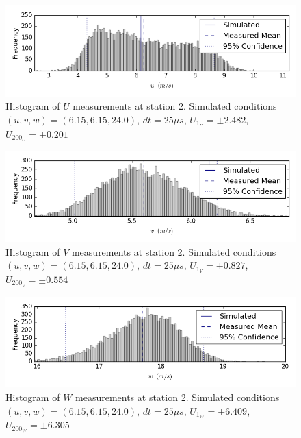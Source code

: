 \begin{figure}[H]
\centering
\includegraphics[width=6in]{figs/Ely_May28th02001/uncertainty_Ely_May28th02001_U}
\caption{Histogram of $U$ measurements at station 2. Simulated conditions $(u,v,w)=(6.15, 6.15, 24.0)$, $dt=25 \mu s$, $U_1_U=\pm 2.482$, $U_200_U=\pm 0.201$}
\label{fig:uncertainty_Ely_May28th02001_U}
\end{figure}


\begin{figure}[H]
\centering
\includegraphics[width=6in]{figs/Ely_May28th02001/uncertainty_Ely_May28th02001_V}
\caption{Histogram of $V$ measurements at station 2. Simulated conditions $(u,v,w)=(6.15, 6.15, 24.0)$, $dt=25 \mu s$, $U_1_V=\pm 0.827$, $U_200_V=\pm 0.554$}
\label{fig:uncertainty_Ely_May28th02001_V}
\end{figure}


\begin{figure}[H]
\centering
\includegraphics[width=6in]{figs/Ely_May28th02001/uncertainty_Ely_May28th02001_W}
\caption{Histogram of $W$ measurements at station 2. Simulated conditions $(u,v,w)=(6.15, 6.15, 24.0)$, $dt=25 \mu s$, $U_1_W=\pm 6.409$, $U_200_W=\pm 6.305$}
\label{fig:uncertainty_Ely_May28th02001_W}
\end{figure}


